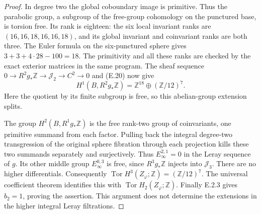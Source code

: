 \begin{proof}
In degree two the global coboundary image is primitive.
Thus the parabolic group, a subgroup of the free-group
cohomology on the punctured base, is torsion free. Its rank
is eighteen: the six local invariant ranks are
\((16,16,18,16,16,18)\), and its global invariant and
coinvariant ranks are both three. The Euler formula on the
six-punctured sphere gives \(3+3+4\cdot28-100=18\).
The primitivity and all these ranks are checked by the exact
exterior matrices in the same program. The sheaf sequence
\(0\to R^2g_*\mathbb Z\to\mathcal J_2\to C^2\to0\)
and (E.20) now give
\[
 H^1(B,R^2g_*\mathbb Z)
     =\mathbb Z^{18}\oplus(\mathbb Z/12)^7.
\]
Here the quotient by its finite subgroup is free, so this
abelian-group extension splits.

The group \(H^2(B,R^1g_*\mathbb Z)\) is the free
rank-two group of coinvariants, one primitive summand from
each factor. Pulling back the integral degree-two
transgression of the original sphere fibration through each
projection kills these two summands separately and
surjectively. Thus \(E_\infty^{2,1}=0\) in the Leray
sequence of \(g\). Its other middle group
\(E_\infty^{0,3}\) is free, since \(R^3g_*\mathbb Z\)
injects into \(\mathcal J_3\). There are no higher
differentials. Consequently
\(\operatorname{Tor}H^3(Z_\varphi;\mathbb Z)
=(\mathbb Z/12)^7\). The universal coefficient theorem
identifies this with \(\operatorname{Tor}H_2(Z_\varphi;\mathbb Z)\).
Finally E.2.3 gives \(b_2=1\), proving the assertion.
This argument does not determine the extensions in the
higher integral Leray filtrations.
\end{proof}

